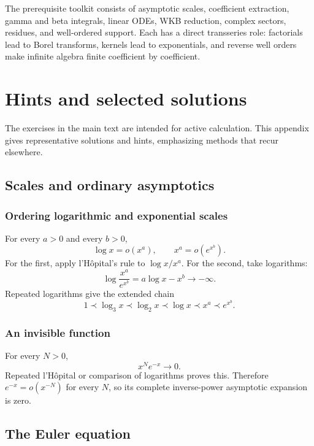 \documentclass[11pt,openany]{book}
\theoremstyle{definition}
\theoremstyle{plain}
\theoremstyle{remark}
\newcommand{\precdom}{\prec}
\begin{document}
\begin{summarybox}
The prerequisite toolkit consists of asymptotic scales, coefficient extraction, gamma and beta integrals, linear ODEs, WKB reduction, complex sectors, residues, and well-ordered support. Each has a direct transseries role: factorials lead to Borel transforms, kernels lead to exponentials, and reverse well orders make infinite algebra finite coefficient by coefficient.
\end{summarybox}


\chapter{Hints and selected solutions}\label{app:solutions}

The exercises in the main text are intended for active calculation. This appendix gives representative solutions and hints, emphasizing methods that recur elsewhere.

\section{Scales and ordinary asymptotics}

\subsection*{Ordering logarithmic and exponential scales}

For every $a>0$ and every $b>0$,
\[
 \log x=o(x^a),
 \qquad
 x^a=o(e^{x^b}).
\]
For the first, apply l'H\^opital's rule to $\log x/x^a$. For the second, take logarithms:
\[
 \log\frac{x^a}{e^{x^b}}=a\log x-x^b\longrightarrow-\infty.
\]
Repeated logarithms give the extended chain
\[
 1\precdom\log_3x\precdom\log_2x\precdom\log x
 \precdom x^a\precdom e^{x^b}.
\]

\subsection*{An invisible function}

For every $N>0$,
\[
 x^Ne^{-x}\longrightarrow0.
\]
Repeated l'H\^opital or comparison of logarithms proves this. Therefore $e^{-x}=o(x^{-N})$ for every $N$, so its complete inverse-power asymptotic expansion is zero.

\section{The Euler equation}
\end{document}
